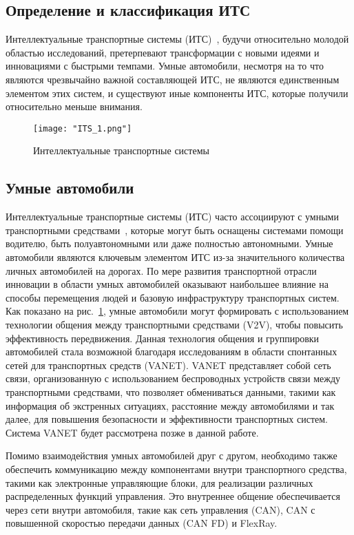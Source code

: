 \subsection*{Определение и классификация ИТС}

Интеллектуальные транспортные системы (ИТС)~\cite{qureshi2013survey}, будучи относительно молодой областью исследований, претерпевают трансформации с новыми идеями и инновациями с быстрыми темпами. Умные автомобили, несмотря на то что являются чрезвычайно важной составляющей ИТС, не являются единственным элементом этих систем, и существуют иные компоненты ИТС, которые получили относительно меньше внимания.

\begin{figure}[!h]
    \centering
    \texttt{[image: "ITS\_1.png"]}
    \caption{Интеллектуальные транспортные системы}
    \label{fig:its}
\end{figure}

\subsection*{Умные автомобили}

Интеллектуальные транспортные системы (ИТС) часто ассоциируют с умными транспортными средствами~\cite{i2018vehicular}, которые могут быть оснащены системами помощи водителю, быть полуавтономными или даже полностью автономными. Умные автомобили являются ключевым элементом ИТС из-за значительного количества личных автомобилей на дорогах. По мере развития транспортной отрасли инновации в области умных автомобилей оказывают наибольшее влияние на способы перемещения людей и базовую инфраструктуру транспортных систем. Как показано на рис.~\ref{fig:its}, умные автомобили могут формировать  с использованием технологии общения между транспортными средствами (V2V), чтобы повысить эффективность передвижения. Данная технология общения и группировки автомобилей стала возможной благодаря исследованиям в области спонтанных сетей для транспортных средств (VANET). VANET представляет собой сеть связи, организованную с использованием беспроводных устройств связи между транспортными средствами, что позволяет обмениваться данными, такими как информация об экстренных ситуациях, расстояние между автомобилями и так далее, для повышения безопасности и эффективности транспортных систем. Система VANET будет рассмотрена позже в данной работе.

Помимо взаимодействия умных автомобилей друг с другом, необходимо также обеспечить коммуникацию между компонентами внутри транспортного средства, такими как электронные управляющие блоки, для реализации различных распределенных функций управления. Это внутреннее общение обеспечивается через сети внутри автомобиля, такие как сеть управления (CAN), CAN с повышенной скоростью передачи данных (CAN FD) и FlexRay.

